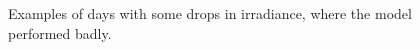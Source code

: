 \begin{figure}[ht!]
    \qquad
    \caption{Examples of days with some drops in irradiance, where the model performed badly.
    \label{fig:full_med_bad}}
\end{figure}

\clearpage
